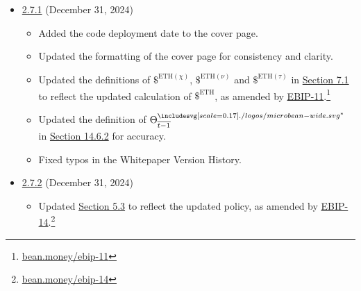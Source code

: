 \documentclass[class=article, crop=false]{standalone}
\begin{document}
\begin{itemize}[topsep=0pt, itemsep=3pt,leftmargin=16pt]
    \item \href{https://github.com/BeanstalkFarms/Beanstalk-Whitepaper/blob/master/version-history/beanstalk2_7_1.pdf}{2.7.1} (December 31, 2024)
    
    \begin{itemize}
        \item Added the code deployment date to the cover page.
        \item Updated the formatting of the cover page for consistency and clarity.
        \item Updated the definitions of $\$^{\text{ETH}(\chi)}$, $\$^{\text{ETH}(\nu)}$ and $\$^{\text{ETH}(\tau)}$ in \hyperlink{subsection.7.1}{Section 7.1} to reflect the updated calculation of $\$^{\text{ETH}}$, as amended by \href{https://bean.money/ebip-11}{EBIP-11}.\footnote{\href{https://bean.money/ebip-11}{bean.money/ebip-11}}
        \item Updated the definition of $\Theta_{\overline{t-1}}^{{\bean}^*}$ in \hyperlink{subsubsection.14.6.2}{Section 14.6.2} for accuracy.
        \item Fixed typos in the Whitepaper Version History.
    \end{itemize}

        \item \href{https://github.com/BeanstalkFarms/Beanstalk-Whitepaper/blob/master/version-history/beanstalk2_7_2.pdf}{2.7.2} (December 31, 2024)
    
    \begin{itemize}
        \item Updated \hyperlink{subsection.5.3}{Section 5.3} to reflect the updated 
         policy, as amended by \href{https://bean.money/ebip-14}{EBIP-14}.\footnote{\href{https://bean.money/ebip-14}{bean.money/ebip-14}}
    \end{itemize}
\end{itemize}
\end{document}
